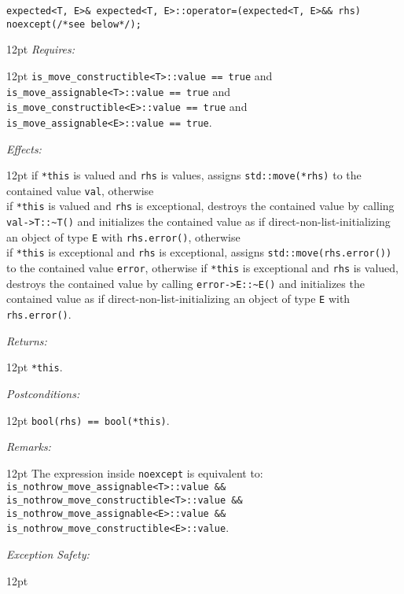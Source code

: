 \documentclass[a4paper,10pt]{article}
\newcommand{\cpp}[1]{\lstinline{#1}}
\newcommand{\wordingItem}[1]{\noindent\textit{#1:}}
\newenvironment{wordingTextItem}[1]{\wordingItem{#1}\vspace{7pt}\noindent\begin{adjustwidth}{12pt}{}}{\vspace{7pt}\end{adjustwidth}}
\newenvironment{wordingPara}{\begin{adjustwidth}{12pt}{}}{\end{adjustwidth}}
\begin{document}
\begin{lstlisting}[xleftmargin=0pt]
expected<T, E>& expected<T, E>::operator=(expected<T, E>&& rhs) noexcept(/*see below*/); 
\end{lstlisting}
\begin{wordingPara}
\begin{wordingTextItem}{Requires}
\cpp{is_move_constructible<T>::value == true} and \\
\cpp{is_move_assignable<T>::value == true} and \\
\cpp{is_move_constructible<E>::value == true} and
\cpp{is_move_assignable<E>::value == true}.
\end{wordingTextItem}
\begin{wordingTextItem}{Effects}
if \cpp{*this} is valued and \cpp{rhs} is values, assigns \cpp{std::move(*rhs)} to the contained value \cpp{val}, otherwise \\
if \cpp{*this} is valued and \cpp{rhs} is exceptional, destroys the contained value by calling \cpp{val->T::~T()} and  initializes the contained value as if direct-non-list-initializing an object of type \cpp{E} with \cpp{rhs.error()}, otherwise \\
if \cpp{*this} is exceptional and \cpp{rhs} is exceptional, assigns \cpp{std::move(rhs.error())} to the contained value \cpp{error}, otherwise  
if \cpp{*this} is exceptional and \cpp{rhs} is valued, destroys the contained value by calling \cpp{error->E::~E()} and  initializes the contained value as if direct-non-list-initializing an object of type \cpp{E} with \cpp{rhs.error()}.
\end{wordingTextItem}
\begin{wordingTextItem}{Returns}
\cpp{*this}.
\end{wordingTextItem}
\begin{wordingTextItem}{Postconditions}
\cpp{bool(rhs) == bool(*this)}.
\end{wordingTextItem}
\begin{wordingTextItem}{Remarks}
The expression inside \cpp{noexcept} is equivalent to:\\
\cpp{is_nothrow_move_assignable<T>::value &&}\\
\cpp{is_nothrow_move_constructible<T>::value &&}\\
\cpp{is_nothrow_move_assignable<E>::value &&}\\
\cpp{is_nothrow_move_constructible<E>::value}.
\end{wordingTextItem}
\begin{wordingTextItem}{Exception Safety}

\end{wordingTextItem}
\end{wordingPara}
\end{document}

